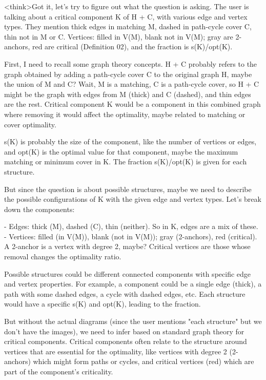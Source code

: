 <think>Got it, let's try to figure out what the question is asking. The user is talking about a critical component K of H + C, with various edge and vertex types. They mention thick edges in matching M, dashed in path-cycle cover C, thin not in M or C. Vertices: filled in V(M), blank not in V(M); gray are 2-anchors, red are critical (Definition 02), and the fraction is s(K)/opt(K). 

First, I need to recall some graph theory concepts. H + C probably refers to the graph obtained by adding a path-cycle cover C to the original graph H, maybe the union of M and C? Wait, M is a matching, C is a path-cycle cover, so H + C might be the graph with edges from M (thick) and C (dashed), and thin edges are the rest. Critical component K would be a component in this combined graph where removing it would affect the optimality, maybe related to matching or cover optimality.

s(K) is probably the size of the component, like the number of vertices or edges, and opt(K) is the optimal value for that component, maybe the maximum matching or minimum cover in K. The fraction s(K)/opt(K) is given for each structure. 

But since the question is about possible structures, maybe we need to describe the possible configurations of K with the given edge and vertex types. Let's break down the components:

- Edges: thick (M), dashed (C), thin (neither). So in K, edges are a mix of these. 
- Vertices: filled (in V(M)), blank (not in V(M)); gray (2-anchors), red (critical). A 2-anchor is a vertex with degree 2, maybe? Critical vertices are those whose removal changes the optimality ratio.

Possible structures could be different connected components with specific edge and vertex properties. For example, a component could be a single edge (thick), a path with some dashed edges, a cycle with dashed edges, etc. Each structure would have a specific s(K) and opt(K), leading to the fraction.

But without the actual diagrams (since the user mentions "each structure" but we don't have the images), we need to infer based on standard graph theory for critical components. Critical components often relate to the structure around vertices that are essential for the optimality, like vertices with degree 2 (2-anchors) which might form paths or cycles, and critical vertices (red) which are part of the component's criticality.

